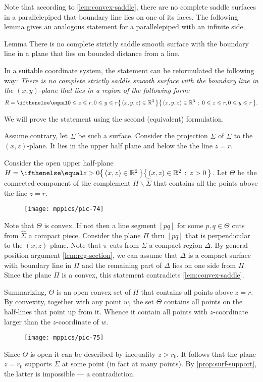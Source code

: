 Note that according to \ref{lem:convex-saddle}, there are no complete saddle surfaces in a parallelepiped that boundary line lies on one of its faces.
The following lemma gives an analogous statement for a parallelepiped with an infinite side.

\begin{thm}{Lemma}\label{lem:region}
There is no complete strictly saddle smooth surface 
with the boundary line in a plane
that lies on bounded distance from a line.
\end{thm}

In a suitable coordinate system, the statement can be reformulated the following way:
\emph{There is no complete strictly saddle smooth surface 
with the boundary line in the $(x,y)$-plane
that lies in a region of the following form:}
\[R=\set{(x,y,z)\in\RR^3}{0\le z\le r, 0\le y\le r}.\]

We will prove the statement using the second (equivalent) formulation.

Assume contrary, let $\Sigma$ be such a surface.
Consider the projection $\hat \Sigma$ of $\Sigma$ to the $(x,z)$-plane.
It lies in the upper half plane and below the the line $z=r$.

Consider the open upper half-plane $H=\set{(x,z)\in \RR^2}{z> 0}$. 
Let $\Theta$ be the connected component of the complement $H\backslash \hat \Sigma$ that contains all the points above the line $z=r$.

\begin{figure}[h!]
\vskip-0mm
\centering
\texttt{[image: mppics/pic-74]}
\vskip0mm
\end{figure}

Note that $\Theta$ is convex.
If not then a line segment $[pq]$ for some $p,q\in \Theta$ cuts from $\hat\Sigma$ a compact piece.
Consider the plane $\Pi$ thru $[pq]$ that is perpendicular to the $(x,z)$-plane.
Note that $\pi$ cuts from $\Sigma$ a compact region $\Delta$.
By general position argument \ref{lem:reg-section}, 
we can assume that $\Delta$ is a compact surface with boundary line in $\Pi$ and the remaining part of $\Delta$ lies on one side from $\Pi$.
Since the plane $\Pi$ is a convex, this statement contradicts \ref{lem:convex-saddle}.

Summarizing, $\Theta$ is an open convex set of $H$ that contains all points above $z=r$.
By convexity, together with any point $w$, the set $\Theta$ contains all points on the half-lines that point up from it. 
Whence it contain all points with $z$-coordinate larger than the $z$-coordinate of $w$.
\begin{figure}[h!]
\vskip-0mm
\centering
\texttt{[image: mppics/pic-75]}
\vskip0mm
\end{figure}
Since $\Theta$ is open it can be described by inequality $z>r_0$.
It follows that the plane $z=r_0$ supports $\Sigma$ at some point (in fact at many points).
By \ref{prop:surf-support}, the latter is impossible --- a contradiction.
\qeds

